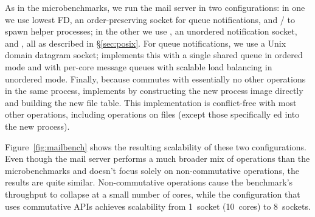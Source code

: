 As in the microbenchmarks, we run the mail server in two configurations:
in one we use lowest FD, an order-preserving socket for queue
notifications, and / to spawn helper processes; in
the other we use , an unordered notification socket, and
, all as described in \S\ref{sec:posix}.
For queue notifications, we use a Unix domain datagram socket;
\sys implements this with a single shared queue in ordered mode and with
per-core message queues with scalable load balancing in unordered
mode.  Finally, because  commutes with essentially no other
operations in the same process,
\sys implements  by constructing the new process image
directly and building the new file
table. This implementation is conflict-free with most other operations,
including operations on
 files (except those specifically ed into the
new process).

Figure~\ref{fig:mailbench} shows the resulting scalability of these two
configurations.  Even though the mail server performs a much broader mix
of operations than the microbenchmarks and doesn't focus solely on
non-commutative operations, the results are quite similar.
Non-commutative operations cause the benchmark's throughput to collapse
at a small number of cores, while the configuration that uses
commutative APIs achieves 
scalability from 1~socket
(10~cores) to 8~sockets.
%
%



%   

\begin{comment}
\begin{figure}
  \centering
  
  \caption{Scalability of $n$ cores forking and exiting a process on xv6 and Linux.}
  \label{fig:forktest}
\end{figure}
\end{comment}
